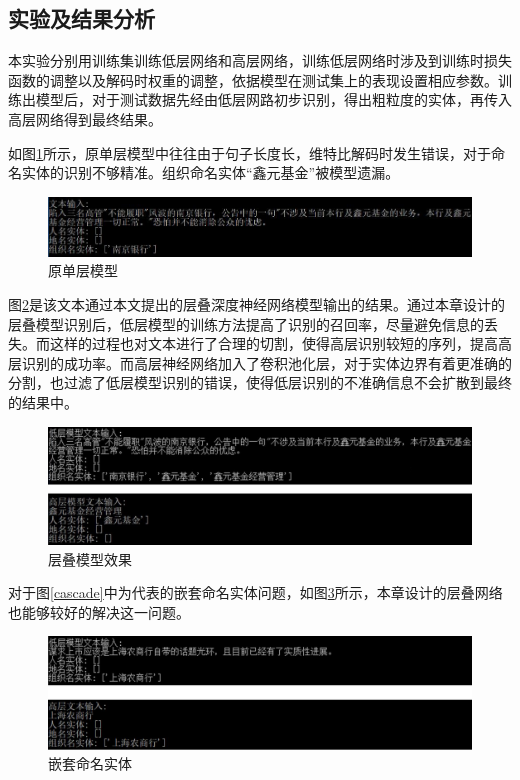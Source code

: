 \documentclass[winfonts,master,oneside,nobackinfo]{njuthesis}
\begin{document}
\subsection{实验及结果分析}

本实验分别用训练集训练低层网络和高层网络，训练低层网络时涉及到训练时损失函数的调整以及解码时权重的调整，依据模型在测试集上的表现设置相应参数。训练出模型后，对于测试数据先经由低层网路初步识别，得出粗粒度的实体，再传入高层网络得到最终结果。

如图\ref{one-layer}所示，原单层模型中往往由于句子长度长，维特比解码时发生错误，对于命名实体的识别不够精准。组织命名实体“鑫元基金”被模型遗漏。

\begin{figure}[h]
\centering
\includegraphics[width=1\textwidth]{./figure/原单层模型.jpg}
\caption{原单层模型}
\label{one-layer}
\end{figure}

图\ref{prob1}是该文本通过本文提出的层叠深度神经网络模型输出的结果。通过本章设计的层叠模型识别后，低层模型的训练方法提高了识别的召回率，尽量避免信息的丢失。而这样的过程也对文本进行了合理的切割，使得高层识别较短的序列，提高高层识别的成功率。而高层神经网络加入了卷积池化层，对于实体边界有着更准确的分割，也过滤了低层模型识别的错误，使得低层识别的不准确信息不会扩散到最终的结果中。

\begin{figure}[h]
\centering
\includegraphics[width=1\textwidth]{./figure/层叠模型效果.jpg}
\caption{层叠模型效果}
\label{prob1}
\end{figure}

对于图\ref{cascade}中为代表的嵌套命名实体问题，如图\ref{solve-cascade}所示，本章设计的层叠网络也能够较好的解决这一问题。

\begin{figure}[H]
\centering
\includegraphics[width=1\textwidth]{./figure/层叠模型嵌套命名实体.jpg}
\caption{嵌套命名实体}
\label{solve-cascade}
\end{figure}
\end{document}
